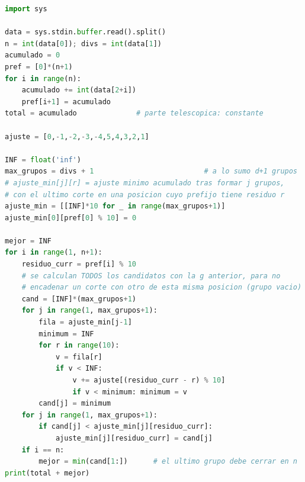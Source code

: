
\begin{lstlisting}[language=Python]
import sys

data = sys.stdin.buffer.read().split()
n = int(data[0]); divs = int(data[1])
acumulado = 0
pref = [0]*(n+1)
for i in range(n):
    acumulado += int(data[2+i])
    pref[i+1] = acumulado
total = acumulado              # parte telescopica: constante

ajuste = [0,-1,-2,-3,-4,5,4,3,2,1]

INF = float('inf')
max_grupos = divs + 1                          # a lo sumo d+1 grupos
# ajuste_min[j][r] = ajuste minimo acumulado tras formar j grupos,
# con el ultimo corte en una posicion cuyo prefijo tiene residuo r
ajuste_min = [[INF]*10 for _ in range(max_grupos+1)]
ajuste_min[0][pref[0] % 10] = 0

mejor = INF
for i in range(1, n+1):
    residuo_curr = pref[i] % 10
    # se calculan TODOS los candidatos con la g anterior, para no
    # encadenar un corte con otro de esta misma posicion (grupo vacio)
    cand = [INF]*(max_grupos+1)
    for j in range(1, max_grupos+1):
        fila = ajuste_min[j-1]
        minimum = INF
        for r in range(10):
            v = fila[r]
            if v < INF:
                v += ajuste[(residuo_curr - r) % 10]
                if v < minimum: minimum = v
        cand[j] = minimum
    for j in range(1, max_grupos+1):
        if cand[j] < ajuste_min[j][residuo_curr]:
            ajuste_min[j][residuo_curr] = cand[j]
    if i == n:
        mejor = min(cand[1:])      # el ultimo grupo debe cerrar en n
print(total + mejor)
\end{lstlisting}